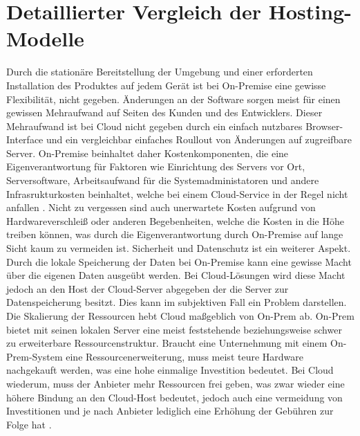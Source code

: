 \documentclass[12pt,bibtotoc]{article}
\begin{document}
	\section{Detaillierter Vergleich der Hosting-Modelle}
			Durch die stationäre Bereitstellung der Umgebung und einer erforderten Installation des Produktes auf jedem Gerät ist bei On-Premise eine gewisse Flexibilität, nicht gegeben.
			Änderungen an der Software sorgen meist für einen gewissen Mehraufwand auf Seiten des Kunden und des Entwicklers. Dieser Mehraufwand ist bei Cloud nicht gegeben durch ein einfach nutzbares Browser-Interface und ein vergleichbar einfaches Roullout von Änderungen auf zugreifbare Server. 
			On-Premise beinhaltet daher Kostenkomponenten, die eine Eigenverantwortung für Faktoren wie Einrichtung des Servers vor Ort, Serversoftware, Arbeitsaufwand für die Systemadministatoren und andere Infrasrukturkosten beinhaltet, welche bei einem Cloud-Service in der Regel nicht anfallen \cite{Fisher.2018}.
			Nicht zu vergessen sind auch unerwartete Kosten aufgrund von Hardwareverschleiß oder anderen Begebenheiten, welche die Kosten in die Höhe treiben können, was durch die Eigenverantwortung durch On-Premise auf lange Sicht kaum zu vermeiden ist.
			\newline
			Sicherheit und Datenschutz ist ein weiterer Aspekt. Durch die lokale Speicherung der Daten bei On-Premise kann eine gewisse Macht über die eigenen Daten ausgeübt werden. 
			Bei Cloud-Lösungen wird diese Macht jedoch an den Host der Cloud-Server abgegeben der die Server zur Datenspeicherung besitzt. Dies kann im subjektiven Fall ein Problem darstellen. 
			\newline
			Die Skalierung der Ressourcen hebt Cloud maßgeblich von On-Prem ab. On-Prem bietet mit seinen lokalen Server eine meist feststehende beziehungsweise schwer zu erweiterbare Ressourcenstruktur. Braucht eine Unternehmung mit einem On-Prem-System eine 
			Ressourcenerweiterung, muss meist teure Hardware nachgekauft werden, was eine hohe einmalige Investition bedeutet.
			Bei Cloud wiederum, muss der Anbieter mehr Ressourcen frei geben, was zwar wieder eine höhere Bindung an den Cloud-Host bedeutet, jedoch auch eine vermeidung von Investitionen und je nach Anbieter lediglich eine Erhöhung der Gebühren zur Folge hat \cite{Murugesan.2016}.
			\newline
\end{document}
